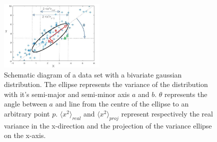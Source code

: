\begin{figure}
    \centering
    \includegraphics[width=0.45\textwidth,keepaspectratio]{figures/ellips.jpg}
    \caption{Schematic diagram of a data set with a bivariate gaussian distribution. The ellipse represents the variance of the distribution with it's semi-major and semi-minor axis $a$ and $b$. $\theta$ represents the angle between $a$ and line from the centre of the ellipse to an arbitrary point $p$. $\langle x^2 \rangle _{real}$ and $\langle x^2 \rangle _{proj}$ represent respectively the real variance in the x-direction and the projection of the variance ellipse on the x-axis.}
    \label{fig_ellipse}
\end{figure}

